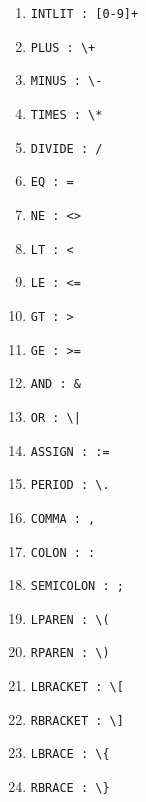 \documentclass{article}
\begin{document}
\begin{enumerate}
  \item \verb|INTLIT : [0-9]+|

  \item \verb|PLUS : \+|

  \item \verb|MINUS : \-|

  \item \verb|TIMES : \*|

  \item \verb|DIVIDE : /|

  \item \verb|EQ : =|

  \item \verb|NE : <>|

  \item \verb|LT : <|

  \item \verb|LE : <=|

  \item \verb|GT : >|

  \item \verb|GE : >=|

  \item \verb|AND : &|

  \item \verb$OR : \|$

  \item \verb|ASSIGN : :=|

  \item \verb|PERIOD : \.|

  \item \verb|COMMA : ,|

  \item \verb|COLON : :|

  \item \verb|SEMICOLON : ;|

  \item \verb|LPAREN : \(|

  \item \verb|RPAREN : \)|

  \item \verb|LBRACKET : \[|

  \item \verb|RBRACKET : \]|

  \item \verb|LBRACE : \{|

  \item \verb|RBRACE : \}|
\end{enumerate}
\end{document}
